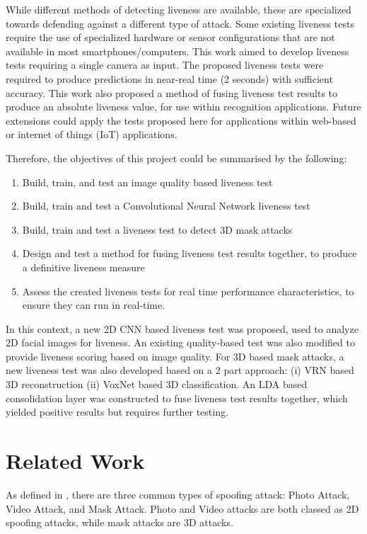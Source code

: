 \documentclass[12pt,a4paper]{article}
\begin{document}
    While different methods of detecting liveness are available, these are specialized towards defending against a different type of attack.
    Some existing liveness tests require the use of specialized hardware or sensor configurations that are not available in most smartphones/computers. 
    This work aimed to develop liveness tests requiring a single camera as input. The proposed liveness tests were required to produce predictions in near-real time (2 seconds) with sufficient accuracy.
    This work also proposed a method of fusing liveness test results to produce an absolute liveness value, for use within recognition applications.
    Future extensions could apply the tests proposed here for applications within web-based or internet of things (IoT) applications. 

    Therefore, the objectives of this project could be summarised by the following:

    \begin{center}
        \begin{enumerate}
            \item Build, train, and test an image quality based liveness test
            \item Build, train and test a Convolutional Neural Network liveness test
            \item Build, train and test a liveness test to detect 3D mask attacks
            \item Design and test a method for fusing liveness test results together, to produce a definitive liveness measure
            \item Assess the created liveness tests for real time performance characteristics, to ensure they can run in real-time.
        \end{enumerate}
    \end{center}

    In this context, a new 2D CNN based liveness test was proposed, used to analyze 2D facial images for liveness. An existing quality-based test was also modified to provide liveness scoring based on image quality. For 3D based mask attacks, a new liveness test was also developed based on a 2 part approach: (i) VRN based 3D reconstruction (ii) VoxNet based 3D classification.
    An LDA based consolidation layer was constructed to fuse liveness test results together, which yielded positive results but requires further testing.
\section{Related Work}
    As defined in \cite{FaceSpoofingAttacksStudy}, there are three common types of spoofing attack: Photo Attack, Video Attack, and Mask Attack.
    Photo and Video attacks are both classed as 2D spoofing attacks, while mask attacks are 3D attacks.
\end{document}
